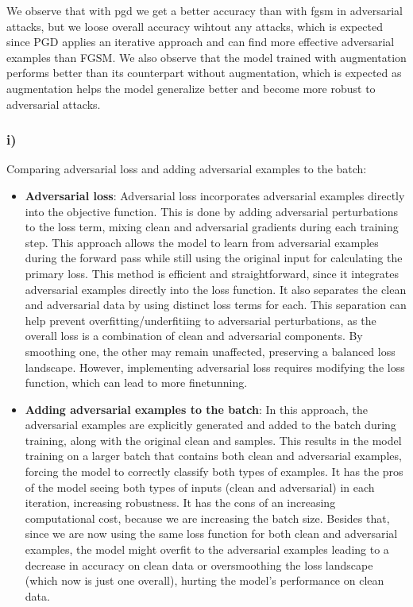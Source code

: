 \documentclass{article}
\begin{document}
We observe that with pgd we get a better accuracy than with fgsm in adversarial attacks, but we loose overall accuracy wihtout any attacks, which is expected since PGD applies an iterative approach and can find more effective adversarial examples than FGSM. We also observe that the model trained with augmentation performs better than its counterpart without augmentation, which is expected as augmentation helps the model generalize better and become more robust to adversarial attacks.

\subsubsection*{i)}

Comparing adversarial loss and adding adversarial examples to the batch: 

\begin{itemize}
    \item \textbf{Adversarial loss}: Adversarial loss incorporates adversarial examples directly into the objective function. This is done by adding adversarial perturbations to the loss term, mixing clean and adversarial gradients during each training step. This approach allows the model to learn from adversarial examples during the forward pass while still using the original input for calculating the primary loss. This method is efficient and straightforward, since it integrates adversarial examples directly into the loss function. It also separates the clean and adversarial data by using distinct loss terms for each. This separation can help prevent overfitting/underfitiing to adversarial perturbations, as the overall loss is a combination of clean and adversarial components. By smoothing one, the other may remain unaffected, preserving a balanced loss landscape. However, implementing adversarial loss requires modifying the loss function, which can lead to more finetunning. 

    \item \textbf{Adding adversarial examples to the batch}: In this approach, the adversarial examples are explicitly
    generated and added to the batch during training, along with the original clean and samples. This results in the model training on a larger batch that contains both clean and adversarial examples, forcing the model to correctly classify  both types of examples. It has the pros of the model seeing both types of inputs (clean and adversarial) in each iteration, increasing robustness. It has the cons of an increasing computational cost, because we are increasing the batch size. Besides that, since we are now using the same loss function for both clean and adversarial examples, the model might overfit to the adversarial examples leading to a decrease in accuracy on clean data or oversmoothing the loss landscape (which now is just one overall), hurting the model's performance on clean data.
\end{itemize}
\end{document}
